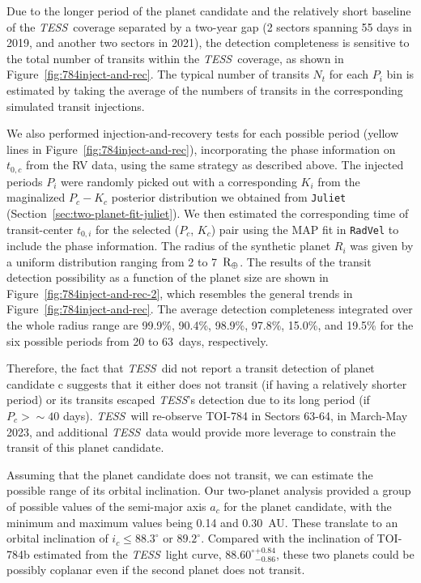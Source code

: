 \documentclass[twocolumn]{aastex631}
\newcommand{\code}[1]{{\texttt{#1}}}
\newcommand{\tess}{\textit{TESS}\ }
\begin{document}
Due to the longer period of the planet candidate and the relatively short baseline of the \tess coverage separated by a two-year gap (2 sectors spanning 55 days in 2019, and another two sectors in 2021), the detection completeness is sensitive to the total number of transits within the \tess coverage, as shown in Figure~\ref{fig:784inject-and-rec}. The typical number of transits $N_t$ for each $P_i$ bin is estimated by taking the average of the numbers of transits in the corresponding simulated transit injections. 

We also performed injection-and-recovery tests for each possible period (yellow lines in Figure~\ref{fig:784inject-and-rec}), incorporating the phase information on $t_{0,c}$ from the RV data, using the same strategy as described above. The injected periods $P_i$ were randomly picked out with a corresponding $K_i$ from the maginalized $P_c-K_c$ posterior distribution we obtained from \code{Juliet} (Section~\ref{sec:two-planet-fit-juliet}). We then estimated the corresponding time of transit-center $t_{0, i}$ for the selected ($P_c$, $K_c$) pair using the MAP fit in \code{RadVel} to include the phase information. The radius of the synthetic planet $R_i$ was given by a uniform distribution ranging from 2 to 7~$\rm R_{\oplus}$. The results of the transit detection possibility as a function of the planet size are shown in Figure~\ref{fig:784inject-and-rec-2}, which resembles the general trends in Figure~\ref{fig:784inject-and-rec}. The average detection completeness integrated over the whole radius range are 99.9\%, 90.4\%, 98.9\%, 97.8\%, 15.0\%, and 19.5\% for the six possible periods from 20 to 63~days, respectively. 

Therefore, the fact that \tess did not report a transit detection of planet candidate c suggests that it either does not transit (if having a relatively shorter period) or its transits escaped \textit{TESS}'s detection due to its long period (if $P_c > \sim 40$ days). \tess will re-observe TOI-784 in Sectors 63-64, in March-May 2023, and additional \tess data would provide more leverage to constrain the transit of this planet candidate.
 
Assuming that the planet candidate does not transit, we can estimate the possible range of its orbital inclination. Our two-planet analysis provided a group of possible values of the semi-major axis $a_c$ for the planet candidate, with the minimum and maximum values being 0.14 and 0.30~AU. These translate to an orbital inclination of $i_c \leqslant 88.3^{\circ}$ or $89.2^{\circ}$. Compared with the inclination of TOI-784b estimated from the \tess light curve, ${88.60^{\circ}}^{+0.84}_{-0.86}$, these two planets could be possibly coplanar even if the second planet does not transit.
\end{document}
